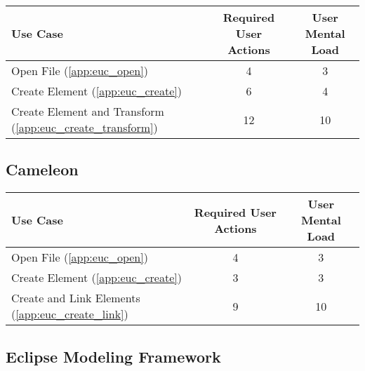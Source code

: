 \begin{tabularx}{\textwidth}{Xcc}
\textbf{Use Case} & \textbf{Required User Actions} & \textbf{User Mental Load}\\
\hline
Open File (\ref{app:euc_open})        & 4 & 3 \\
Create Element (\ref{app:euc_create}) & 6 & 4 \\
Create Element and Transform (\ref{app:euc_create_transform}) & 12 & 10
\end{tabularx}

\subsection*{Cameleon}




\begin{tabularx}{\textwidth}{Xcc}
\textbf{Use Case} & \textbf{Required User Actions} & \textbf{User Mental Load}\\
\hline
Open File (\ref{app:euc_open})                       & 4 & 3 \\
Create Element (\ref{app:euc_create})                & 3 & 3 \\
Create and Link Elements (\ref{app:euc_create_link}) & 9 & 10
\end{tabularx}

\subsection*{Eclipse Modeling Framework}

